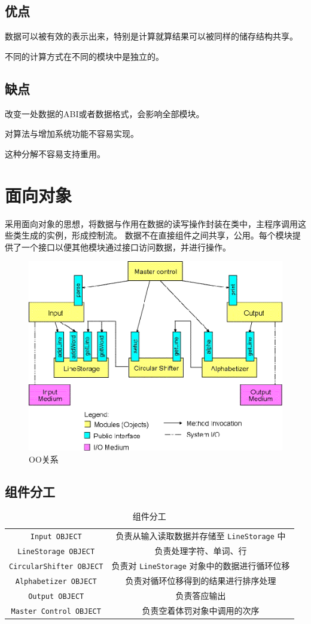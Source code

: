 \documentclass{ctexart}
\begin{document}
\subsection{优点}
数据可以被有效的表示出来，特别是计算就算结果可以被同样的储存结构共享。

不同的计算方式在不同的模块中是独立的。

\subsection{缺点}
改变一处数据的ABI或者数据格式，会影响全部模块。

对算法与增加系统功能不容易实现。

这种分解不容易支持重用。

\section{面向对象}
采用面向对象的思想，将数据与作用在数据的读写操作封装在类中，主程序调用这些类生成的实例，形成控制流。
数据不在直接组件之间共享，公用。每个模块提供了一个接口以便其他模块通过接口访问数据，并进行操作。

\begin{figure}[h!]
  \centering
  \includegraphics[width=0.7\linewidth]{homework1-oo-1}
  \caption{OO关系}
  \label{fig:homework1-oo-1}
\end{figure}

\subsection{组件分工}
\begin{table}[h!]
  \centering
  \caption{组件分工}
  \begin{tabular}{c|c}
    \verb|Input OBJECT| & 负责从输入读取数据并存储至 \lstinline|LineStorage| 中\\
    \verb|LineStorage OBJECT| & 负责处理字符、单词、行\\
    \verb|CircularShifter OBJECT| & 负责对 \lstinline|LineStorage| 对象中的数据进行循环位移 \\
    \verb|Alphabetizer OBJECT| & 负责对循环位移得到的结果进行排序处理\\
    \verb|Output OBJECT| & 负责答应输出 \\
    \verb|Master Control OBJECT| & 负责空着体罚对象中调用的次序 \\
  \end{tabular}
\end{table}
\end{document}
